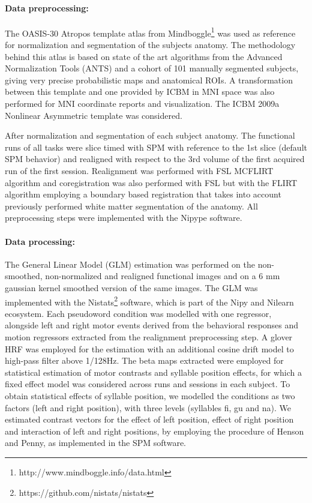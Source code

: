 \paragraph{Data preprocessing:}
The OASIS-30 Atropos template atlas from Mindboggle\footnote{http://www.mindboggle.info/data.html} was used as reference for normalization and segmentation of the subjects anatomy. The methodology behind this atlas is based on state of the art algorithms from the Advanced Normalization Tools (ANTS) and a cohort of 101 manually segmented subjects, giving very precise probabilistic maps and anatomical ROIs\citep{klein2005mindboggle}. A transformation between this template and one provided by ICBM in MNI space was also performed for MNI coordinate reports and visualization. The ICBM 2009a Nonlinear Asymmetric template was considered\citep{collins1999animal+}.

After normalization and segmentation of each subject anatomy. The functional runs of all tasks were slice timed with SPM with reference to the 1st slice (default SPM behavior) and realigned with respect to the 3rd volume of the first acquired run of the first session.
Realignment was performed with FSL MCFLIRT algorithm and coregistration was also performed with FSL but with the FLIRT algorithm employing a boundary based registration that takes into account previously performed white matter segmentation of the anatomy\citep{greve2009accurate}.
All preprocessing steps were implemented with the Nipype software\citep{gorgolewski2011nipype}.

\paragraph{Data processing:}
The General Linear Model (GLM) estimation was performed on the non-smoothed, non-normalized and realigned functional images and on a 6 mm gaussian kernel smoothed version of the same images.
The GLM was implemented with the Nistats\footnote{https://github.com/nistats/nistats} software, which is part of the Nipy and Nilearn\citep{abraham2014machine} ecosystem.
Each pseudoword condition was modelled with one regressor, alongside left and right motor events derived from the behavioral responses and motion regressors extracted from the realignment preprocessing step.
A glover HRF was employed for the estimation with an additional cosine drift model to high-pass filter above 1/128Hz.
The beta maps extracted were employed for statistical estimation of motor contrasts and syllable position effects, for which a fixed effect model was considered across runs and sessions in each subject.
To obtain statistical effects of syllable position, we modelled the conditions as two factors (left and right position), with three levels (syllables fi, gu and na).
We estimated contrast vectors for the effect of left position, effect of right position and interaction of left and right positions, by employing the procedure of Henson and Penny\citep{henson2003anovas}, as implemented in the SPM software.

